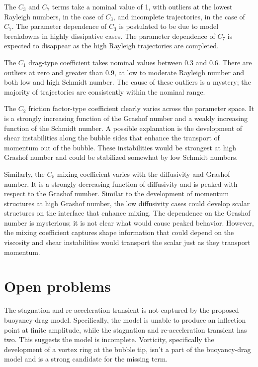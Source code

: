 The $C_3$ and $C_7$ terms take a nominal value of 1, with outliers at the lowest Rayleigh numbers, in the case of $C_3$, and incomplete trajectories, in the case of $C_7$.
The parameter dependence of $C_3$ is postulated to be due to model breakdowns in highly dissipative cases.
The parameter dependence of $C_7$ is expected to disappear as the high Rayleigh trajectories are completed.

The $C_1$ drag-type coefficient takes nominal values between $0.3$ and $0.6$.
There are outliers at zero and greater than $0.9$, at low to moderate Rayleigh number and both low and high Schmidt number.
The cause of these outliers is a mystery; the majority of trajectories are consistently within the nominal range.

The $C_2$ friction factor-type coefficient clearly varies across the parameter space.
It is a strongly increasing function of the Grashof number and a weakly increasing function of the Schmidt number.
A possible explanation is the development of shear instabilities along the bubble sides that enhance the transport of momentum out of the bubble.
These instabilities would be strongest at high Grashof number and could be stabilized somewhat by low Schmidt numbers.

Similarly, the $C_5$ mixing coefficient varies with the diffusivity and Grashof number.
It is a strongly decreasing function of diffusivity and is peaked with respect to the Grashof number.
Similar to the development of momentum structures at high Grashof number, the low diffusivity cases could develop scalar structures on the interface that enhance mixing.
The dependence on the Grashof number is mysterious; it is not clear what would cause peaked behavior.
However, the mixing coefficient captures shape information that could depend on the viscosity and shear instabilities would transport the scalar just as they transport momentum.


\section{Open problems}

The stagnation and re-acceleration transient is not captured by the proposed buoyancy-drag model.
Specifically, the model is unable to produce an inflection point at finite amplitude, while the stagnation and re-acceleration transient has two.
This suggests the model is incomplete.
Vorticity, specifically the development of a vortex ring at the bubble tip, isn't a part of the buoyancy-drag model and is a strong candidate for the missing term.

